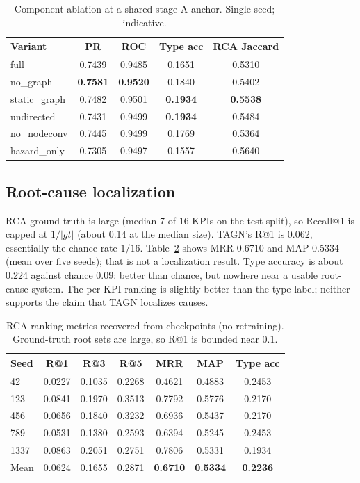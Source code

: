 \documentclass[conference]{IEEEtran}
\begin{document}
\begin{table}[t]
\centering
\caption{Component ablation at a shared stage-A anchor. Single seed; indicative.}
\label{tab:ablation}
\footnotesize
\begin{tabular}{lcccc}
\toprule
Variant & PR & ROC & Type acc & RCA Jaccard \\
\midrule
full & 0.7439 & 0.9485 & 0.1651 & 0.5310 \\
no\_graph & \textbf{0.7581} & \textbf{0.9520} & 0.1840 & 0.5402 \\
static\_graph & 0.7482 & 0.9501 & \textbf{0.1934} & \textbf{0.5538} \\
undirected & 0.7431 & 0.9499 & \textbf{0.1934} & 0.5484 \\
no\_nodeconv & 0.7445 & 0.9499 & 0.1769 & 0.5364 \\
hazard\_only & 0.7305 & 0.9497 & 0.1557 & 0.5640 \\
\bottomrule
\end{tabular}
\end{table}

\subsection{Root-cause localization}

RCA ground truth is large (median 7 of 16 KPIs on the test split), so Recall@1 is capped at $1/|gt|$ (about 0.14 at the median size). TAGN's R@1 is 0.062, essentially the chance rate $1/16$. Table~\ref{tab:rca} shows MRR 0.6710 and MAP 0.5334 (mean over five seeds); that is not a localization result. Type accuracy is about 0.224 against chance 0.09: better than chance, but nowhere near a usable root-cause system. The per-KPI ranking is slightly better than the type label; neither supports the claim that TAGN localizes causes.

\begin{table}[t]
\centering
\caption{RCA ranking metrics recovered from checkpoints (no retraining). Ground-truth root sets are large, so R@1 is bounded near 0.1.}
\label{tab:rca}
\small
\begin{tabular}{lcccccc}
\toprule
Seed & R@1 & R@3 & R@5 & MRR & MAP & Type acc \\
\midrule
42 & 0.0227 & 0.1035 & 0.2268 & 0.4621 & 0.4883 & 0.2453 \\
123 & 0.0841 & 0.1970 & 0.3513 & 0.7792 & 0.5776 & 0.2170 \\
456 & 0.0656 & 0.1840 & 0.3232 & 0.6936 & 0.5437 & 0.2170 \\
789 & 0.0531 & 0.1380 & 0.2593 & 0.6394 & 0.5245 & 0.2453 \\
1337 & 0.0863 & 0.2051 & 0.2751 & 0.7806 & 0.5331 & 0.1934 \\
\midrule
Mean & 0.0624 & 0.1655 & 0.2871 & \textbf{0.6710} & \textbf{0.5334} & \textbf{0.2236} \\
\bottomrule
\end{tabular}
\end{table}
\end{document}
